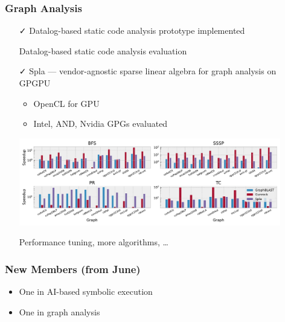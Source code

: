 \documentclass[xcolor=table,aspectratio=169]{beamer}
\begin{document}
\begin{frame}[fragile]
  \frametitle{Graph Analysis}  
  
  \begin{itemize}
    \item[\faCheck] Datalog-based static code analysis prototype implemented
    \item[\faGears] Datalog-based static code analysis evaluation
    \pause 
    \item[\faCheck] Spla --- vendor-agnostic sparse linear algebra for graph analysis on GPGPU
    \begin{itemize}
      \item OpenCL for GPU
      \item Intel, AND, Nvidia GPGs evaluated
    \end{itemize}
    \begin{center}
      \includegraphics[width=0.9\textwidth]{pictures/rq1_rel.pdf}
    \end{center}
     
    \item[\faHourglassHalf] Performance tuning, more algorithms, \ldots
  \end{itemize}
\end{frame}

\begin{frame}[fragile]
  \frametitle{New Members (from June)}  
  
  \begin{itemize}
      \item One in AI-based symbolic execution 
      \item One in graph analysis
  \end{itemize}
\end{frame}
\end{document}
